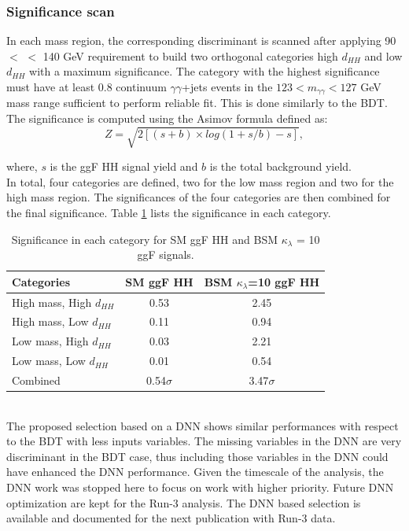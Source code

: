 \subsubsection{Significance scan}
In each mass region, the corresponding discriminant is scanned after applying 90 $<$ \mbb $<$ 140 GeV requirement to build two orthogonal categories high $d_{HH}$ and low $d_{HH}$ with a maximum significance. The category with the highest significance must have at least 0.8 continuum $\gamma\gamma$+jets events in the $123<m_{\gamma\gamma}<127$ GeV mass range sufficient to perform reliable \myy fit. This is done similarly to the BDT. The significance is computed using the Asimov formula \cite{Z} defined as: 
\begin{equation}
    Z = \sqrt{2\left[(s+b)\times log(1+s/b)-s\right]},
\end{equation}

where, $s$ is the ggF HH signal yield and $b$ is the total background yield. \\
In total, four categories are defined, two for the low mass region and two for the high mass region. The significances of the four categories are then combined for the final significance. Table \ref{tab:Sig} lists the significance in each category.
\begin{table}[htbp]
    \centering
    \begin{tabular}{lcc}
        \hline\hline
        Categories & SM ggF HH & BSM $\kappa_\lambda$=10 ggF HH \\
        \hline
        High mass, High $d_{HH}$ & 0.53 & 2.45 \\
        High mass, Low $d_{HH}$ & 0.11 & 0.94 \\
        Low mass, High $d_{HH}$ & 0.03 & 2.21 \\
        Low mass, Low $d_{HH}$ & 0.01 & 0.54 \\
        \hline
        Combined & 0.54$\sigma$ & 3.47$\sigma$ \\
        \hline
        \hline
    \end{tabular}
    \begin{tcolorbox}[colback=black!5!white, colframe=white!75!black]
    \caption{Significance in each category for SM ggF HH and BSM $\kappa_\lambda$ = 10 ggF signals.}
    \label{tab:Sig}
    \end{tcolorbox}
    
\end{table}
\\
The proposed selection based on a DNN shows similar performances with respect to the BDT with less inputs variables. The missing variables in the DNN are very discriminant in the BDT case, thus including those variables in the DNN could have enhanced the DNN performance. Given the timescale of the analysis, the DNN work was stopped here to focus on work with higher priority. Future DNN optimization are kept for the Run-3 analysis. The DNN based selection is available and documented for the next publication with Run-3 data. \\

